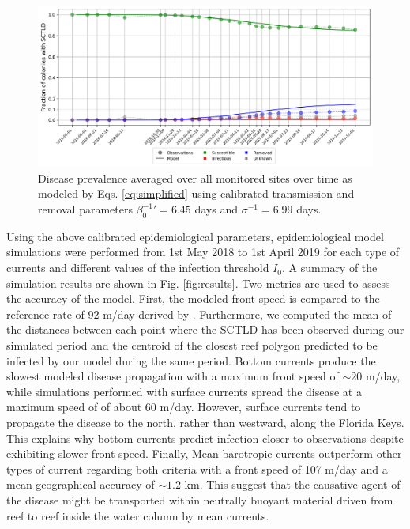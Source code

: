 \documentclass[utf8]{frontiersSCNS}
\begin{document}
\begin{figure}
    \centering
    \includegraphics[width=.95\textwidth]{figures/sir_obs.png}
    \caption{Disease prevalence averaged over all monitored sites over time as modeled by Eqs. \ref{eq:simplified} using calibrated transmission and removal parameters $\beta_0^{-1}'=6.45$ days and $\sigma^{-1}=6.99$ days.}
    \label{fig:calibration}
\end{figure}

Using the above calibrated epidemiological parameters, epidemiological model simulations were performed from 1st May 2018 to 1st April 2019 for each type of currents and different values of the infection threshold $I_0$. A summary of the simulation results are shown in Fig. \ref{fig:results}. Two metrics are used to assess the accuracy of the model. First, the modeled front speed is compared to the reference rate of 92 m/day derived by \cite{muller2020spatial}. Furthermore, we computed the mean of the distances between each point where the SCTLD has been observed during our simulated period and the centroid of the closest reef polygon predicted to be infected by our model during the same period. %
Bottom currents produce the slowest modeled disease propagation with a maximum front speed of $\sim 20$ m/day, while simulations performed with surface currents spread the disease at a maximum speed of of about 60 m/day. However, surface currents tend to propagate the disease to the north, rather than westward, along the Florida Keys. This explains why bottom currents predict infection closer to observations despite exhibiting slower front speed. Finally, Mean barotropic currents outperform other types of current regarding both criteria with a front speed of 107 m/day and a mean geographical accuracy of $\sim1.2$ km. This suggest that the causative agent of the disease might be transported within neutrally buoyant material driven from reef to reef inside the water column by mean currents.
\end{document}
